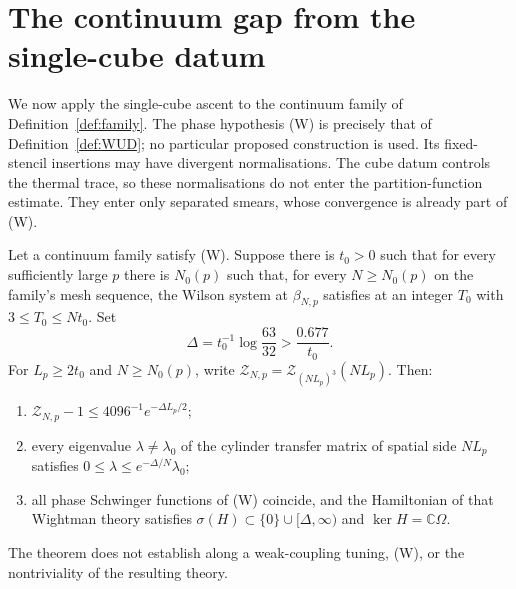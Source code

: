 \section{The continuum gap from the single-cube datum}\label{sc:sec:continuum}

We now apply the single-cube ascent to the continuum family of
Definition~\ref{def:family}. The phase hypothesis \textup{(W)} is precisely
that of Definition~\ref{def:WUD}; no particular proposed construction is
used. Its fixed-stencil insertions may have divergent normalisations.
The cube datum controls the thermal trace, so these normalisations do not
enter the partition-function estimate. They enter only separated smears,
whose convergence is already part of \textup{(W)}.

\begin{theorem}\label{sc:thm:continuum}
Let a continuum family satisfy \textup{(W)}. Suppose there is $t_0>0$ such
that for every sufficiently large $p$ there is $N_0(p)$ such that, for every
$N\ge N_0(p)$ on the family's mesh sequence, the Wilson system at
$\beta_{N,p}$ satisfies \Mcirc{} at an integer $T_0$ with
$3\le T_0\le Nt_0$. Set
\[
\Delta=t_0^{-1}\log\frac{63}{32}>\frac{0.677}{t_0}.
\]
For $L_p\ge2t_0$ and $N\ge N_0(p)$, write
$\mathcal Z_{N,p}=\mathcal Z_{(NL_p)^3}(NL_p)$. Then:
\begin{enumerate}[label=\textup{(\roman*)},leftmargin=*]
\item $\mathcal Z_{N,p}-1\le4096^{-1}e^{-\Delta L_p/2}$;
\item every eigenvalue $\lambda\ne\lambda_0$ of the cylinder transfer matrix
of spatial side $NL_p$ satisfies $0\le\lambda\le e^{-\Delta/N}\lambda_0$;
\item all phase Schwinger functions of \textup{(W)} coincide, and the
Hamiltonian of that Wightman theory satisfies
$\sigma(H)\subset\{0\}\cup[\Delta,\infty)$ and $\ker H=\mathbb C\Omega$.
\end{enumerate}
The theorem does not establish \Mcirc{} along a weak-coupling tuning,
\textup{(W)}, or the nontriviality of the resulting theory.
\end{theorem}

